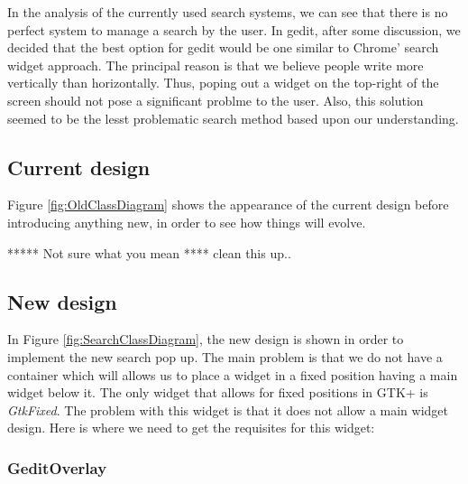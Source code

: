
In the analysis of the currently used search systems, we can see that there is no perfect system to manage a search by the user. In gedit, after some discussion, we decided that the best option for gedit would be one similar to Chrome' search widget approach.  The principal reason is that we believe people write more vertically than horizontally.  Thus, poping out a widget on the top-right of the screen should not pose a significant problme to the user. Also, this solution seemed to be the lesst problematic search method based upon our understanding.

\subsection{Current design}

Figure \ref{fig:OldClassDiagram} shows the appearance  of the current design before introducing anything new, in order to see how 
things will evolve.

***** Not sure what you mean **** clean this up..


\subsection{New design}

In Figure \ref{fig:SearchClassDiagram}, the new design is shown in order to implement the new search pop up. The main problem is that we do not have a container which will allows us to place a widget in a fixed position having a main widget below it. The only widget that allows for fixed positions in GTK+ is \emph{GtkFixed}.   The problem with this widget is that it does not allow a main widget design. Here is where we need to get the requisites for this widget:

\subsubsection{GeditOverlay}

